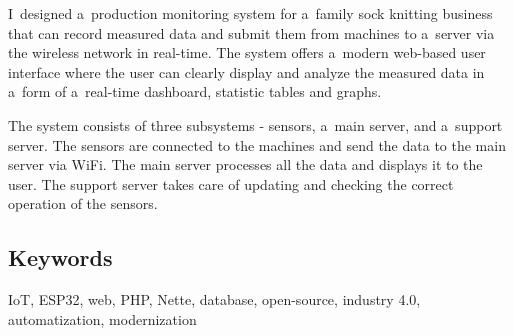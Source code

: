 \documentclass{template/socthesis}
\begin{document}
I~designed a~production monitoring system for a~family sock knitting business that can record measured data and submit them from machines to a~server via the wireless network in real-time.
The system offers a~modern web-based user interface where the user can clearly display and analyze the measured data in a~form of a~real-time dashboard, statistic tables and graphs.

The system consists of three subsystems - sensors, a~main server, and a~support server.
The sensors are connected to the machines and send the data to the main server via WiFi. 
The main server processes all the data and displays it to the user. 
The support server takes care of updating and checking the correct operation of the sensors. 

\subsection*{Keywords}
IoT, ESP32, web, PHP, Nette, database, open-source, industry 4.0, automatization, modernization

\newpage
\pagestyle{plain}

\tableofcontents %

\setcounter{figure}{0}
\setcounter{table}{0}
\newpage



% 











\end{document}

